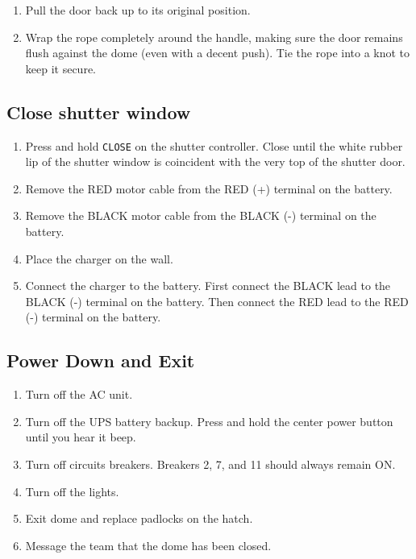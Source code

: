 \documentclass{article}
\begin{document}
		\begin{enumerate}
			
			\item Pull the door back up to its original position.
			
			\item Wrap the rope completely around the handle, making sure the door remains flush against the dome (even with a decent push). Tie the rope into a knot to keep it secure.
			
		\end{enumerate}
		
	\subsection{Close shutter window}
		
		\begin{enumerate}
			
			\item Press and hold \texttt{CLOSE} on the shutter controller. Close until the white rubber lip of the shutter window is coincident with the very top of the shutter door.
			
			\item Remove the RED motor cable from the RED (+) terminal on the battery.
			
			\item Remove the BLACK motor cable from the BLACK (-) terminal on the battery.
			
			\item Place the charger on the wall.
			
			\item Connect the charger to the battery. First connect the BLACK lead to the BLACK (-) terminal on the battery. Then connect the RED lead to the RED (-) terminal on the battery.
			
		\end{enumerate}
		
	\subsection{Power Down and Exit}
	
		\begin{enumerate}
	
			\item Turn off the AC unit.
		
			\item Turn off the UPS battery backup. Press and hold the center power button until you hear it beep.
		
			\item Turn off circuits breakers. Breakers 2, 7, and 11 should always remain ON.
		
			\item Turn off the lights.
		
			\item Exit dome and replace padlocks on the hatch.
		
			\item Message the team that the dome has been closed.
		
		\end{enumerate}
	
\end{document}

